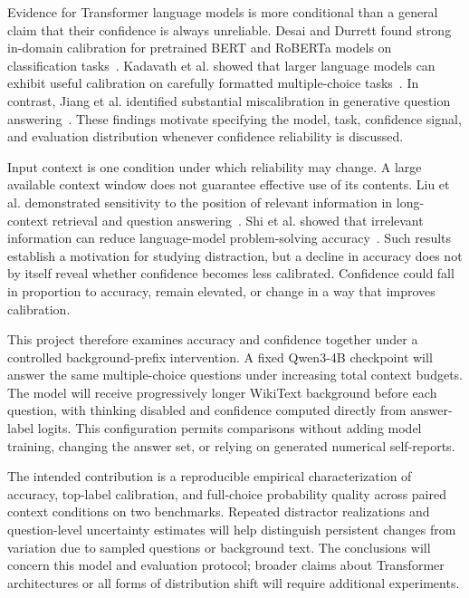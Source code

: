 \documentclass[conference]{IEEEtran}
\begin{document}
Evidence for Transformer language models is more conditional than a general claim that their confidence is always unreliable. Desai and Durrett found strong in-domain calibration for pretrained BERT and RoBERTa models on classification tasks~\cite{desai2020}. Kadavath et al. showed that larger language models can exhibit useful calibration on carefully formatted multiple-choice tasks~\cite{kadavath2022}. In contrast, Jiang et al. identified substantial miscalibration in generative question answering~\cite{jiang2021}. These findings motivate specifying the model, task, confidence signal, and evaluation distribution whenever confidence reliability is discussed.

Input context is one condition under which reliability may change. A large available context window does not guarantee effective use of its contents. Liu et al. demonstrated sensitivity to the position of relevant information in long-context retrieval and question answering~\cite{liu2024}. Shi et al. showed that irrelevant information can reduce language-model problem-solving accuracy~\cite{shi2023}. Such results establish a motivation for studying distraction, but a decline in accuracy does not by itself reveal whether confidence becomes less calibrated. Confidence could fall in proportion to accuracy, remain elevated, or change in a way that improves calibration.

This project therefore examines accuracy and confidence together under a controlled background-prefix intervention. A fixed Qwen3-4B checkpoint will answer the same multiple-choice questions under increasing total context budgets. The model will receive progressively longer WikiText background before each question, with thinking disabled and confidence computed directly from answer-label logits. This configuration permits comparisons without adding model training, changing the answer set, or relying on generated numerical self-reports.

The intended contribution is a reproducible empirical characterization of accuracy, top-label calibration, and full-choice probability quality across paired context conditions on two benchmarks. Repeated distractor realizations and question-level uncertainty estimates will help distinguish persistent changes from variation due to sampled questions or background text. The conclusions will concern this model and evaluation protocol; broader claims about Transformer architectures or all forms of distribution shift will require additional experiments.
\end{document}

